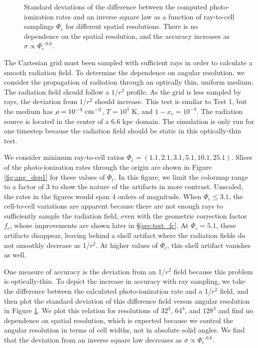 \documentclass[12pt,preprint]{aastex}
\begin{document}
\begin{figure}[t]
  \caption{\label{fig:ang_dep2} Standard deviations of the difference
    between the computed photo-ionization rates and an inverse square
    law as a function of ray-to-cell samplings $\Phi_c$ for different
    spatial resolutions.  There is no dependence on the spatial
    resolution, and the accuracy increases as $\sigma \propto
    \Phi_c^{-0.6}$.}
\end{figure}

The Cartesian grid must been sampled with sufficient rays in order to
calculate a smooth radiation field.  To determine the dependence on
angular resolution, we consider the propagation of radiation through
an optically thin, uniform medium.  The radiation field should follow
a $1/r^2$ profile.  As the grid is less sampled by rays, the deviation
from $1/r^2$ should increase.  This test is similar to Test 1, but the
medium has $\rho = 10^{-3}~\cubecm$, $T = 10^4$ K, and $1 - x_e =
10^{-4}$.  The radiation source is located in the center of a 6.6 kpc
domain.  The simulation is only run for one timestep because the
radiation field should be static in this optically-thin test.  

We consider minimum ray-to-cell ratios $\Phi_c = (1.1, 2.1, 3.1, 5.1,
10.1, 25.1)$.  Slices of the photo-ionization rates through the origin
are shown in Figure \ref{fig:ang_dep1} for these values of $\Phi_c$.
In this figure, we limit the colormap range to a factor of 3 to show
the nature of the artifacts in more contrast.  Unscaled, the rates in
the figures would span 4 orders of magnitude.  When $\Phi_c \le 3.1$,
the cell-to-cell variations are apparent because there are not enough
rays to sufficiently sample the radiation field, even with the
geometric correction factor $f_c$, whose improvements are shown later
in \S\ref{sec:test_fc}.  At $\Phi_c = 5.1$, these artifacts disappear,
leaving behind a shell artifact where the radiation fields do not
smoothly decrease as 1/$r^2$.  At higher values of $\Phi_c$, this
shell artifact vanishes as well.  

One measure of accuracy is the deviation from an 1/$r^2$ field because
this problem is optically-thin.  To depict the increase in accuracy
with ray sampling, we take the difference between the calculated
photo-ionization rate and a 1/$r^2$ field, and then plot the standard
deviation of this difference field versus angular resolution in Figure
\ref{fig:ang_dep2}.  We plot this relation for resolutions of $32^3$,
$64^3$, and $128^3$ and find no dependence on spatial resolution,
which is expected because we control the angular resolution in terms
of cell widths, not in absolute solid angles.  We find that the
deviation from an inverse square law decreases as $\sigma \propto
\Phi_c^{-0.6}$.
\end{document}
